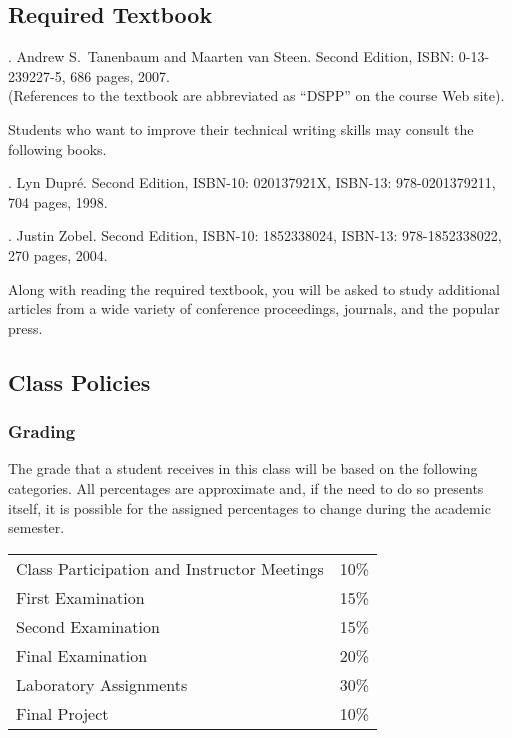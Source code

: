 \subsection*{Required Textbook}

. Andrew S.\ Tanenbaum and Maarten van Steen.
Second Edition, ISBN: 0-13-239227-5, 686 pages, 2007. \\
(References to the textbook are abbreviated as ``DSPP'' on the course Web site).

\noindent
Students who want to improve their technical writing skills may consult the following books.

. Lyn Dupr\'e. Second Edition,  ISBN-10: 020137921X,
ISBN-13: 978-0201379211, 704 pages, 1998.

.  Justin Zobel. Second Edition,  ISBN-10: 1852338024, ISBN-13:
978-1852338022, 270 pages, 2004.

\noindent
Along with reading the required textbook, you will be asked to study additional articles from a wide variety of
conference proceedings, journals, and the popular press.

\subsection*{Class Policies}

\subsubsection*{Grading}

The grade that a student receives in this class will be based on the following categories. All percentages are
approximate and, if the need to do so presents itself, it is possible for the assigned percentages to change during the
academic semester.

\begin{center}
  \begin{tabular}{ll}
    Class Participation and Instructor Meetings & 10\% \\
    First Examination & 15\% \\
    Second Examination & 15\% \\
    Final Examination & 20\% \\
    Laboratory Assignments & 30\% \\
    Final Project & 10\%
  \end{tabular}
\end{center}

